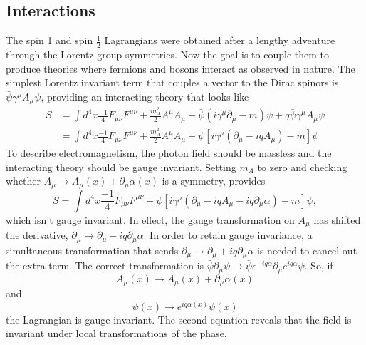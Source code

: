 \subsection{Interactions}

The spin 1 and spin $\frac{1}{2}$ Lagrangians were obtained after a lengthy adventure through the Lorentz group symmetries. Now the goal is to couple them to produce theories where fermions and bosons interact as observed in nature. The simplest Lorentz invariant term that couples a vector to the Dirac spinors is $\bar{\psi}\gamma^\mu A_\mu \psi$, providing an interacting theory that looks like 
\begin{equation}
\begin{split}
S &= \int d^4x \frac{-1}{4}F_{\mu\nu}F^{\mu\nu} + \frac{m_A^2}{2} A^\mu A_\mu + \bar{\psi}\left(i\gamma^\mu\partial_\mu - m\right)\psi + q\bar{\psi}\gamma^\mu A_\mu \psi \\
&= \int d^4x \frac{-1}{4}F_{\mu\nu}F^{\mu\nu} + \frac{m_A^2}{2} A^\mu A_\mu + \bar{\psi}\left[i\gamma^\mu\left(\partial_\mu - iqA_\mu\right)- m \right]\psi 
\end{split}
\end{equation}
To describe electromagnetism, the photon field should be massless and the interacting theory should be gauge invariant. Setting $m_A$ to zero and checking whether $A_\mu \rightarrow A_\mu(x) + \partial_\mu\alpha(x)$ is a symmetry, provides  
\begin{equation}
S = \int d^4x \frac{-1}{4}F_{\mu\nu}F^{\mu\nu} + \bar{\psi}\left[i\gamma^\mu\left(\partial_\mu - iqA_\mu - iq\partial_\mu\alpha\right)- m \right]\psi, 
\end{equation}
which isn't gauge invariant. In effect, the gauge transformation on $A_\mu$ has shifted the derivative, $\partial_\mu \rightarrow \partial_\mu - iq\partial_\mu\alpha$. In order to retain gauge invariance, a simultaneous transformation that sends $\partial_\mu \rightarrow \partial_\mu + iq\partial_\mu\alpha$ is needed to cancel out the extra term. The correct transformation is $\bar{\psi}\partial_\mu\psi \rightarrow \bar{\psi} e^{-iq\alpha} \partial_\mu e^{iq\alpha} \psi$. So, if 
\begin{equation}
A_\mu(x) \rightarrow A_\mu(x) + \partial_\mu\alpha(x)
\end{equation}
and
\begin{equation}
\psi(x) \rightarrow e^{iq\alpha(x)}\psi(x) 
\end{equation}
the Lagrangian is gauge invariant. The second equation reveals that the field is invariant under local transformations of the phase. 

